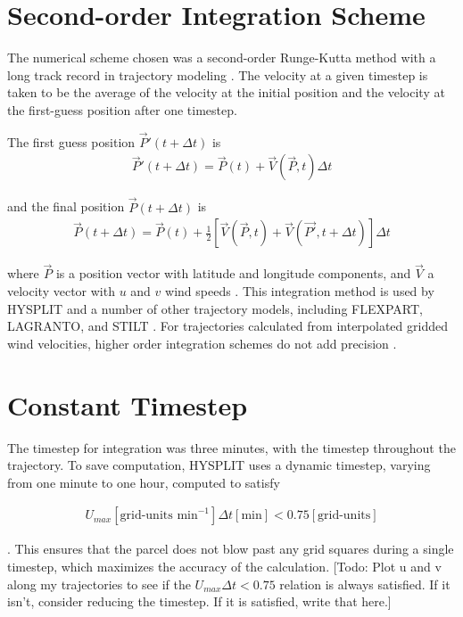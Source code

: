 \section{Second-order Integration Scheme}
The numerical scheme chosen was a second-order Runge-Kutta method with a long track record in trajectory modeling \cite{petterssen_weather_1940}.
The velocity at a given timestep is taken to be the average of the velocity at the initial position and the velocity at the first-guess position after one timestep.

The first guess position $\vec{P}' (t + \Delta t)$ is 
\begin{align}
\vec{P}' (t + \Delta t) = \vec{P}(t) + \vec{V} (\vec{P}, t) \Delta t
\end{align}

and the final position $\vec{P} (t + \Delta t)$ is
\begin{align}
\vec{P} (t + \Delta t) = \vec{P} (t) + \frac{1}{2} \left [ \vec{V} (\vec{P}, t) + \vec{V} (\vec{P'}, t + \Delta t) \right ] \Delta t
\end{align}

where $\vec{P}$ is a position vector with latitude and longitude components, and $\vec{V}$ a velocity vector with $u$ and $v$ wind speeds \cite{draxler_description_1997}.
This integration method is used by HYSPLIT and a number of other trajectory models, including FLEXPART, LAGRANTO, and STILT \cite{stein_noaas_2015} \cite{bowman_input_2013}. 
For trajectories calculated from interpolated gridded wind velocities, higher order integration schemes do not add precision \cite{draxler_description_1997}.  

\section{Constant Timestep}
The timestep for integration was three minutes, with the timestep throughout the trajectory. 
To save computation, HYSPLIT uses a dynamic timestep, varying from one minute to one hour, computed to satisfy

\begin{align}
U_{max} [\text{grid-units min}^{-1}] \Delta t [\text{min}] < 0.75 [\text{grid-units}] 
\end{align}

\cite{draxler_description_1997}. This ensures that the parcel does not blow past any grid squares during a single timestep, which maximizes the accuracy of the calculation. 
[Todo: Plot u and v along my trajectories to see if the $U_{max} \Delta t < 0.75$ relation is always satisfied. If it isn't, consider reducing the timestep. If it is satisfied, write that here.]

